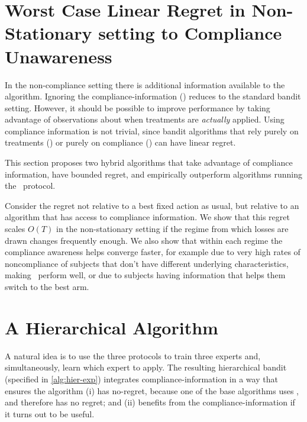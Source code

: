 
\section{Worst Case Linear Regret in Non-Stationary setting to Compliance Unawareness}

In the non-compliance setting there is additional information available to the algorithm. Ignoring the compliance-information (\chosen) reduces to the standard bandit setting. However, it should be possible to improve performance by taking advantage of observations about when treatments are \emph{actually} applied. Using compliance information is not trivial, since bandit algorithms that rely purely on treatments (\actual) or purely on compliance (\comply) can have linear regret.

This section proposes two hybrid algorithms that take advantage of compliance information, have bounded regret, and empirically outperform algorithms running the \chosen\, protocol.


Consider the regret not relative to a best fixed action as usual, but relative to an algorithm that has access to compliance information.
We show that this regret scales $O(T)$ in the non-stationary setting if the regime from which losses are drawn changes frequently enough. We also show that within each regime the compliance awareness helps converge faster, for example due to very high rates of noncompliance of subjects that don't have different underlying characteristics, making \actual\, perform well, or due to subjects having information that helps them switch to the best arm.


\section{A Hierarchical Algorithm}

A natural idea is to use the three protocols to train three experts and, simultaneously, learn which expert to apply. The resulting hierarchical bandit (specified in  \ref{alg:hier-exp}) integrates compliance-information in a way that ensures the algorithm (i) has no-regret, because one of the base algorithms uses \chosen, and therefore has no regret; and (ii) benefits from the compliance-information if it turns out to be useful.

